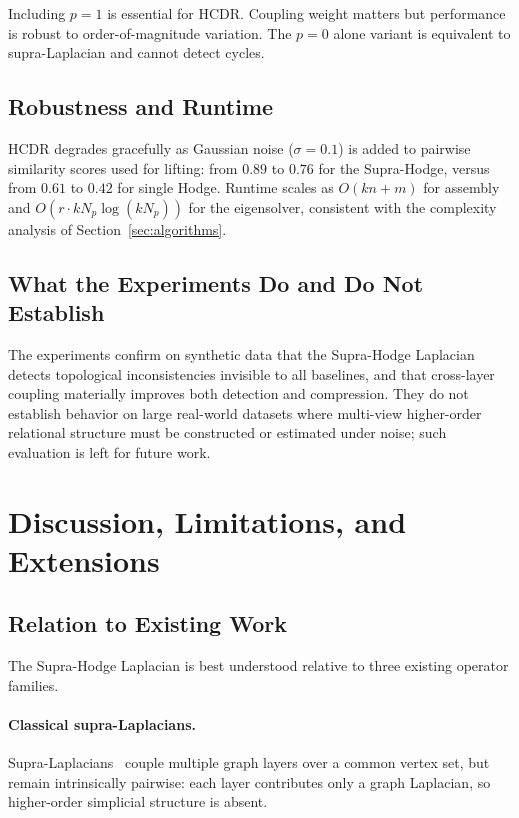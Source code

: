 \documentclass[11pt]{article}
\theoremstyle{definition}
\theoremstyle{remark}
\begin{document}
Including $p=1$ is essential for HCDR. Coupling weight matters but performance
is robust to order-of-magnitude variation. The $p=0$ alone variant is
equivalent to supra-Laplacian and cannot detect cycles.

\subsection{Robustness and Runtime}

HCDR degrades gracefully as Gaussian noise ($\sigma=0.1$) is added to pairwise
similarity scores used for lifting: from $0.89$ to $0.76$ for the Supra-Hodge, versus from
$0.61$ to $0.42$ for single Hodge. Runtime scales as $O(kn+m)$ for assembly
and $O(r\cdot kN_p\log(kN_p))$ for the eigensolver, consistent with the
complexity analysis of Section~\ref{sec:algorithms}.

\subsection{What the Experiments Do and Do Not Establish}

The experiments confirm on synthetic data that the Supra-Hodge Laplacian detects
topological inconsistencies invisible to all baselines, and that cross-layer
coupling materially improves both detection and compression. They do not
establish behavior on large real-world datasets where multi-view higher-order
relational structure must be constructed or estimated under noise; such
evaluation is left for future work.


\section{Discussion, Limitations, and Extensions}
\label{sec:discussion}

\subsection{Relation to Existing Work}

The Supra-Hodge Laplacian is best understood relative to three existing operator families.

\paragraph{Classical supra-Laplacians.}
Supra-Laplacians~\cite{dedomenico2013,gomez2013} couple multiple graph layers over a common vertex set, but remain intrinsically pairwise: each layer contributes only a graph Laplacian, so higher-order simplicial structure is absent.
\end{document}

